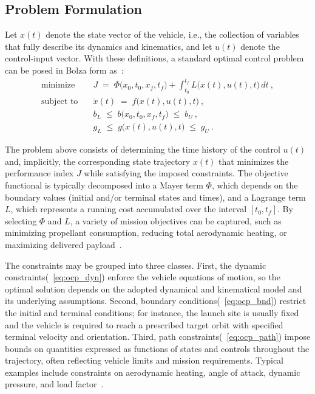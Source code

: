 
\subsection{Problem Formulation}

Let $x(t)$ denote the state vector of the vehicle, i.e., the collection of variables that fully describe its dynamics and kinematics, and let $u(t)$ denote the control-input vector. With these definitions, a standard optimal control problem can be posed in Bolza form as~\cite{Optimization_Review}:
\begin{subequations}\label{eq:ocp}
\begin{align}
\text{minimize} \quad
& J \;=\; \Phi\!\bigl(x_0,t_0,x_f,t_f\bigr)
+ \int_{t_0}^{t_f} L\!\bigl(x(t),u(t),t\bigr)\,dt \ ,
\label{eq:ocp_obj} \\[2mm]
\text{subject to}\quad
& \dot{x}(t) \;=\; f\!\bigl(x(t),u(t),t\bigr) \ ,
\label{eq:ocp_dyn} \\
& b_L \;\le\; b\!\bigl(x_0,t_0,x_f,t_f\bigr) \;\le\; b_U \ ,
\label{eq:ocp_bnd} \\
& g_L \;\le\; g\!\bigl(x(t),u(t),t\bigr) \;\le\; g_U \ .
\label{eq:ocp_path}
\end{align}
\end{subequations}

The problem above consists of determining the time history of the control $u(t)$ and, implicitly, the corresponding state trajectory $x(t)$ that minimizes the performance index $J$ while satisfying the imposed constraints. The objective functional is typically decomposed into a Mayer term $\Phi$, which depends on the boundary values (initial and/or terminal states and times), and a Lagrange term $L$, which represents a running cost accumulated over the interval $[t_0,t_f]$. By selecting $\Phi$ and $L$, a variety of mission objectives can be captured, such as minimizing propellant consumption, reducing total aerodynamic heating, or maximizing delivered payload~\cite{300years}.

The constraints may be grouped into three classes. First, the dynamic constraints(~\ref{eq:ocp_dyn}) enforce the vehicle equations of motion, so the optimal solution depends on the adopted dynamical and kinematical model and its underlying assumptions. Second, boundary conditions(~\ref{eq:ocp_bnd}) restrict the initial and terminal conditions; for instance, the launch site is usually fixed and the vehicle is required to reach a prescribed target orbit with specified terminal velocity and orientation. Third, path constraints(~\ref{eq:ocp_path}) impose bounds on quantities expressed as functions of states and controls throughout the trajectory, often reflecting vehicle limits and mission requirements. Typical examples include constraints on aerodynamic heating, angle of attack, dynamic pressure, and load factor~\cite{Cremaschi2013TrajectoryOptimization}.

